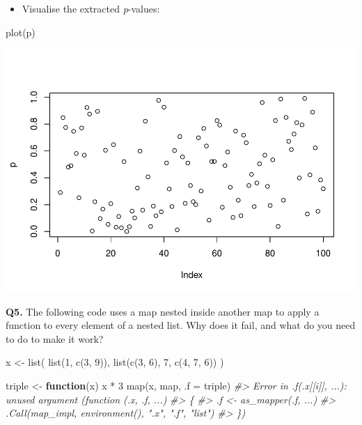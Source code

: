 \documentclass[
]{book}
\newenvironment{Shaded}{\begin{snugshade}}{\end{snugshade}}
\newcommand{\AttributeTok}[1]{\textcolor[rgb]{0.77,0.63,0.00}{#1}}
\newcommand{\CommentTok}[1]{\textcolor[rgb]{0.56,0.35,0.01}{\textit{#1}}}
\newcommand{\ControlFlowTok}[1]{\textcolor[rgb]{0.13,0.29,0.53}{\textbf{#1}}}
\newcommand{\DecValTok}[1]{\textcolor[rgb]{0.00,0.00,0.81}{#1}}
\newcommand{\FunctionTok}[1]{\textcolor[rgb]{0.00,0.00,0.00}{#1}}
\newcommand{\NormalTok}[1]{#1}
\newcommand{\OtherTok}[1]{\textcolor[rgb]{0.56,0.35,0.01}{#1}}
\newcommand{\SpecialCharTok}[1]{\textcolor[rgb]{0.00,0.00,0.00}{#1}}
\providecommand{\tightlist}{%
  \setlength{\itemsep}{0pt}\setlength{\parskip}{0pt}}
\begin{document}
\begin{itemize}
\tightlist
\item
  Visualise the extracted \emph{p}-values:
\end{itemize}

\begin{Shaded}
\begin{Highlighting}[]
\FunctionTok{plot}\NormalTok{(p)}
\end{Highlighting}
\end{Shaded}

\includegraphics{Functionals_files/figure-latex/unnamed-chunk-10-1.pdf}

\textbf{Q5.} The following code uses a map nested inside another map to apply a function to every element of a nested list. Why does it fail, and what do you need to do to make it work?

\begin{Shaded}
\begin{Highlighting}[]
\NormalTok{x }\OtherTok{\textless{}{-}} \FunctionTok{list}\NormalTok{(}
  \FunctionTok{list}\NormalTok{(}\DecValTok{1}\NormalTok{, }\FunctionTok{c}\NormalTok{(}\DecValTok{3}\NormalTok{, }\DecValTok{9}\NormalTok{)),}
  \FunctionTok{list}\NormalTok{(}\FunctionTok{c}\NormalTok{(}\DecValTok{3}\NormalTok{, }\DecValTok{6}\NormalTok{), }\DecValTok{7}\NormalTok{, }\FunctionTok{c}\NormalTok{(}\DecValTok{4}\NormalTok{, }\DecValTok{7}\NormalTok{, }\DecValTok{6}\NormalTok{))}
\NormalTok{)}

\NormalTok{triple }\OtherTok{\textless{}{-}} \ControlFlowTok{function}\NormalTok{(x) x }\SpecialCharTok{*} \DecValTok{3}
\FunctionTok{map}\NormalTok{(x, map, }\AttributeTok{.f =}\NormalTok{ triple)}
\CommentTok{\#\textgreater{} Error in .f(.x[[i]], ...): unused argument (function (.x, .f, ...) }
\CommentTok{\#\textgreater{} \{}
\CommentTok{\#\textgreater{}     .f \textless{}{-} as\_mapper(.f, ...)}
\CommentTok{\#\textgreater{}     .Call(map\_impl, environment(), ".x", ".f", "list")}
\CommentTok{\#\textgreater{} \})}
\end{Highlighting}
\end{Shaded}
\end{document}
